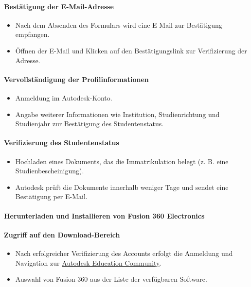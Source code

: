 {\paragraph{ Bestätigung der E-Mail-Adresse}
\begin{itemize}
	\item Nach dem Absenden des Formulars wird eine E-Mail zur Bestätigung empfangen.
	\item Öffnen der E-Mail und Klicken auf den Bestätigungslink zur Verifizierung der Adresse.
\end{itemize}

\paragraph{ Vervollständigung der Profilinformationen}
\begin{itemize}
	\item Anmeldung im Autodesk-Konto.
	\item Angabe weiterer Informationen wie Institution, Studienrichtung und Studienjahr zur Bestätigung des Studentenstatus.
\end{itemize}

\paragraph*{ Verifizierung des Studentenstatus}
\begin{itemize}
	\item Hochladen eines Dokuments, das die Immatrikulation belegt (z. B. eine Studienbescheinigung).
	\item Autodesk prüft die Dokumente innerhalb weniger Tage und sendet eine Bestätigung per E-Mail.
\end{itemize}

\paragraph*{ Herunterladen und Installieren von Fusion 360 Electronics}

\paragraph{Zugriff auf den Download-Bereich}
\begin{itemize}
	\item Nach erfolgreicher Verifizierung des Accounts erfolgt die Anmeldung und Navigation zur \href{https://www.autodesk.com/education/home}{\underline{Autodesk Education Community}}.
	\item Auswahl von Fusion 360 aus der Liste der verfügbaren Software.
\end{itemize}

}
